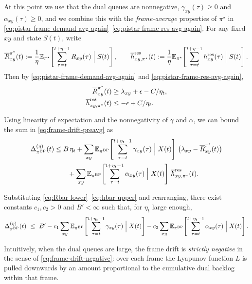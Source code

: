 \documentclass[11pt]{article}
\newcommand{\E}{\mathbb{E}}
\begin{document}
At this point we use that the dual queues are nonnegative,
$\gamma_{xy}(\tau)\ge 0$ and $\alpha_{xy}(\tau)\ge 0$, and we combine
this with the \emph{frame-average} properties of $\pi^\star$ in
\eqref{eq:pistar-frame-demand-avg-again}--\eqref{eq:pistar-frame-res-avg-again}.
For any fixed $xy$ and state $S(t)$, write
\[
\overline{R}_{xy}^{\pi^\star}(t)
:=
\frac{1}{\eta}
\E_{\pi^\star}\!\left[
\sum_{\tau=t}^{t+\eta-1}
R_{xy}(\tau)
\;\Big|\; S(t)
\right],
\qquad
\overline{h}^{\rm res}_{xy,\pi^\star}(t)
:=
\frac{1}{\eta}
\E_{\pi^\star}\!\left[
\sum_{\tau=t}^{t+\eta-1}
h^{\rm res}_{xy}(\tau)
\;\Big|\; S(t)
\right].
\]
Then by \eqref{eq:pistar-frame-demand-avg-again} and
\eqref{eq:pistar-frame-res-avg-again},
\begin{align}
\overline{R}_{xy}^{\pi^\star}(t)
&\ge \lambda_{xy}+\epsilon - C/\eta_t,
\label{eq:Rbar-lower}\\
\overline{h}^{\rm res}_{xy,\pi^\star}(t)
&\le -\epsilon + C/\eta_t.
\label{eq:hbar-upper}
\end{align}

Using linearity of expectation and the nonnegativity of $\gamma$ and
$\alpha$, we can bound the sum in
\eqref{eq:frame-drift-preavg} as
\begin{equation}
\begin{aligned}
\Delta_{\pi^{\rm BP}}^{(\eta)}(t)
&\le
B\,\eta_t
+ \sum_{xy}
\E_{\pi^{\rm BP}}\!\left[
\sum_{\tau=t}^{t+\eta_t-1}
\gamma_{xy}(\tau)
\;\Big|\; X(t)
\right]\,
\big(\lambda_{xy} - \overline{R}_{xy}^{\pi^\star}(t)\big)\\
&\qquad
+ \sum_{xy}
\E_{\pi^{\rm BP}}\!\left[
\sum_{\tau=t}^{t+\eta_t-1}
\alpha_{xy}(\tau)
\;\Big|\; X(t)
\right]\,
\overline{h}^{\rm res}_{xy,\pi^\star}(t).
\end{aligned}
\label{eq:frame-drift-using-averages}
\end{equation}

Substituting \eqref{eq:Rbar-lower}--\eqref{eq:hbar-upper} and rearranging,
there exist constants $c_1,c_2>0$ and $B'<\infty$ such that, for
$\eta_t$ large enough,
\begin{equation}
\Delta_{\pi^{\rm BP}}^{(\eta)}(t)
\ \le\
B'
- c_1
\sum_{xy}
\E_{\pi^{\rm BP}}\!\left[
\sum_{\tau=t}^{t+\eta_t-1}\gamma_{xy}(\tau)
\;\Big|\; X(t)
\right]
- c_2
\sum_{xy}
\E_{\pi^{\rm BP}}\!\left[
\sum_{\tau=t}^{t+\eta_t-1}\alpha_{xy}(\tau)
\;\Big|\; X(t)
\right].
\label{eq:frame-drift-negative}
\end{equation}

Intuitively, when the dual queues are large, the frame drift is
\emph{strictly negative} in the sense of
\eqref{eq:frame-drift-negative}: over each frame the Lyapunov
function $L$ is pulled downwards by an amount proportional to the
cumulative dual backlog within that frame.
\end{document}
